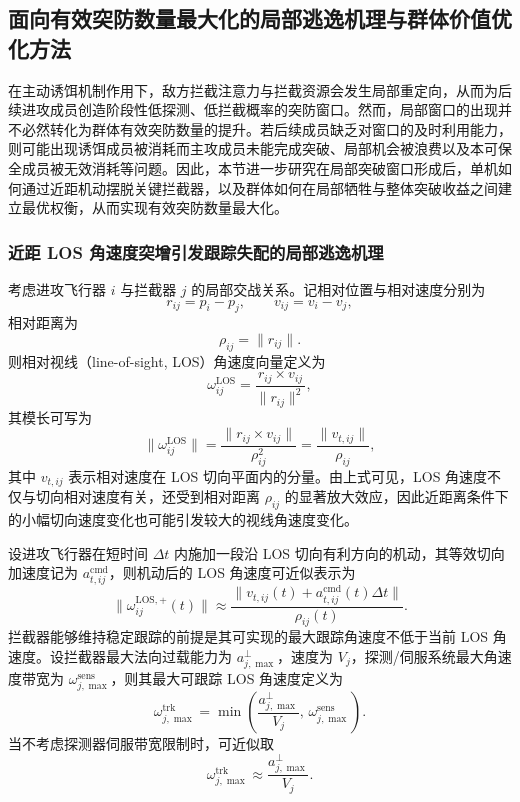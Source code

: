 \subsection{面向有效突防数量最大化的局部逃逸机理与群体价值优化方法}

在主动诱饵机制作用下，敌方拦截注意力与拦截资源会发生局部重定向，从而为后续进攻成员创造阶段性低探测、低拦截概率的突防窗口。然而，局部窗口的出现并不必然转化为群体有效突防数量的提升。若后续成员缺乏对窗口的及时利用能力，则可能出现诱饵成员被消耗而主攻成员未能完成突破、局部机会被浪费以及本可保全成员被无效消耗等问题。因此，本节进一步研究在局部突破窗口形成后，单机如何通过近距机动摆脱关键拦截器，以及群体如何在局部牺牲与整体突破收益之间建立最优权衡，从而实现有效突防数量最大化。

\subsubsection{近距 LOS 角速度突增引发跟踪失配的局部逃逸机理}

考虑进攻飞行器 $i$ 与拦截器 $j$ 的局部交战关系。记相对位置与相对速度分别为
\begin{equation}
r_{ij}=p_i-p_j,\qquad v_{ij}=v_i-v_j,
\end{equation}
相对距离为
\begin{equation}
\rho_{ij}=\|r_{ij}\|.
\end{equation}
则相对视线（line-of-sight, LOS）角速度向量定义为
\begin{equation}
\omega_{ij}^{\mathrm{LOS}}
=
\frac{r_{ij}\times v_{ij}}{\|r_{ij}\|^2},
\end{equation}
其模长可写为
\begin{equation}
\|\omega_{ij}^{\mathrm{LOS}}\|
=
\frac{\|r_{ij}\times v_{ij}\|}{\rho_{ij}^2}
=
\frac{\|v_{t,ij}\|}{\rho_{ij}},
\end{equation}
其中 $v_{t,ij}$ 表示相对速度在 LOS 切向平面内的分量。由上式可见，LOS 角速度不仅与切向相对速度有关，还受到相对距离 $\rho_{ij}$ 的显著放大效应，因此近距离条件下的小幅切向速度变化也可能引发较大的视线角速度变化。

设进攻飞行器在短时间 $\Delta t$ 内施加一段沿 LOS 切向有利方向的机动，其等效切向加速度记为 $a_{t,ij}^{\mathrm{cmd}}$，则机动后的 LOS 角速度可近似表示为
\begin{equation}
\|\omega_{ij}^{\mathrm{LOS},+}(t)\|
\approx
\frac{\|v_{t,ij}(t)+a_{t,ij}^{\mathrm{cmd}}(t)\Delta t\|}{\rho_{ij}(t)}.
\end{equation}
拦截器能够维持稳定跟踪的前提是其可实现的最大跟踪角速度不低于当前 LOS 角速度。设拦截器最大法向过载能力为 $a_{j,\max}^{\perp}$，速度为 $V_j$，探测/伺服系统最大角速度带宽为 $\omega_{j,\max}^{\mathrm{sens}}$，则其最大可跟踪 LOS 角速度定义为
\begin{equation}
\omega_{j,\max}^{\mathrm{trk}}
=
\min\left(
\frac{a_{j,\max}^{\perp}}{V_j},\,
\omega_{j,\max}^{\mathrm{sens}}
\right).
\end{equation}
当不考虑探测器伺服带宽限制时，可近似取
\begin{equation}
\omega_{j,\max}^{\mathrm{trk}}
\approx
\frac{a_{j,\max}^{\perp}}{V_j}.
\end{equation}


